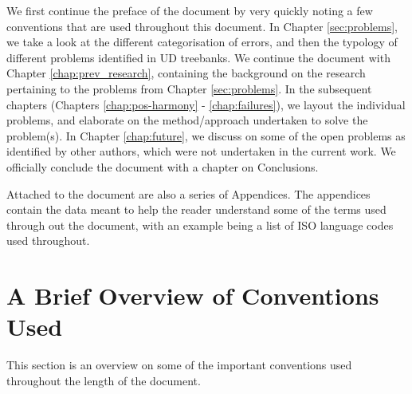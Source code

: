 We first continue the preface of the document by very quickly noting a few conventions that are used throughout this document. In Chapter \ref{sec:problems}, we take a look at the different categorisation of errors, and then the typology of different problems identified in UD treebanks. We continue the document with Chapter \ref{chap:prev_research}, containing the background on the research pertaining to the problems from Chapter \ref{sec:problems}. In the subsequent chapters (Chapters \ref{chap:pos-harmony} - \ref{chap:failures}), we layout the individual problems, and elaborate on the method/approach undertaken to solve the problem(s). In Chapter \ref{chap:future}, we discuss on some of the open problems as identified by other authors, which were not undertaken in the current work. We officially conclude the document with a chapter on Conclusions.

Attached to the document are also a series of Appendices. The appendices contain the data meant to help the reader understand some of the terms used through out the document, with an example being a list of ISO language codes used throughout.

\section{A Brief Overview of Conventions Used}
\label{conventions}

This section is an overview on some of the important conventions used throughout the length of the document.

